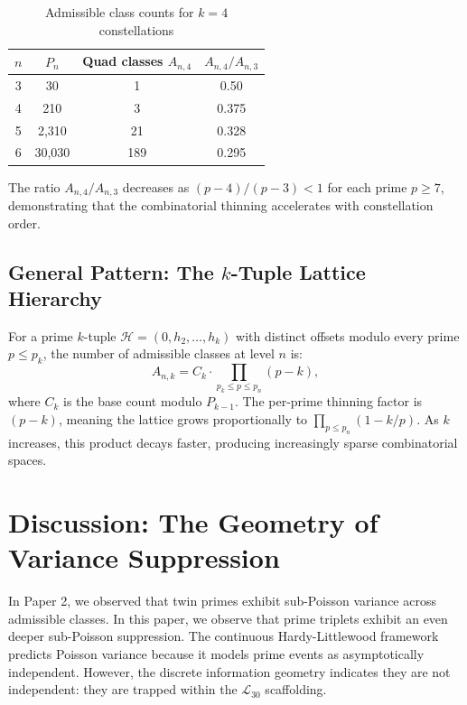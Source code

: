 \documentclass[11pt]{article}
\begin{document}
\begin{table}[h]
\centering
\caption{Admissible class counts for $k=4$ constellations}
\label{tab:quad_counts}
\begin{tabular}{cccc}
\toprule
$n$ & $P_n$ & Quad classes $A_{n,4}$ & $A_{n,4}/A_{n,3}$ \\
\midrule
3 & 30 & 1 & 0.50 \\
4 & 210 & 3 & 0.375 \\
5 & 2{,}310 & 21 & 0.328 \\
6 & 30{,}030 & 189 & 0.295 \\
\bottomrule
\end{tabular}
\end{table}

The ratio $A_{n,4}/A_{n,3}$ decreases as $(p-4)/(p-3) < 1$ for each prime $p \geq 7$, demonstrating that the combinatorial thinning accelerates with constellation order.

\subsection{General Pattern: The $k$-Tuple Lattice Hierarchy}

For a prime $k$-tuple $\mathcal{H} = (0, h_2, \ldots, h_k)$ with distinct offsets modulo every prime $p \leq p_k$, the number of admissible classes at level $n$ is:
\begin{equation}
    A_{n,k} = C_k \cdot \prod_{p_k \le p \le p_n} (p-k),
\end{equation}
where $C_k$ is the base count modulo $P_{k-1}$. The per-prime thinning factor is $(p-k)$, meaning the lattice grows proportionally to $\prod_{p \le p_n} (1 - k/p)$. As $k$ increases, this product decays faster, producing increasingly sparse combinatorial spaces.

\section{Discussion: The Geometry of Variance Suppression}

In Paper 2, we observed that twin primes exhibit sub-Poisson variance across admissible classes. In this paper, we observe that prime triplets exhibit an even deeper sub-Poisson suppression. The continuous Hardy-Littlewood framework predicts Poisson variance because it models prime events as asymptotically independent. However, the discrete information geometry indicates they are not independent: they are trapped within the $\mathcal{L}_{30}$ scaffolding. 
\end{document}
